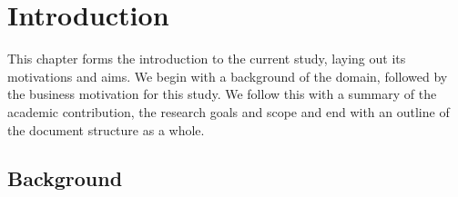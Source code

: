 %
%
%
%
\chapter{Introduction}\label{C.intro}
{This chapter forms the introduction to the current study, laying out its motivations and aims. We begin with a background of the domain, followed by the business motivation for this study. We follow this with a summary of the academic contribution, the research goals and scope and end with an outline of the document structure as a whole.  }
\section{Background}

